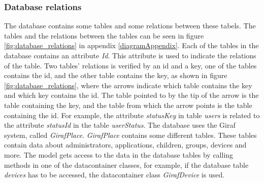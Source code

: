 \subsubsection{Database relations}
The database contains some tables and some relations between these tabels. The tables and the relations between the tables can be seen in figure \ref{fig:database_relations} in appendix \ref{diagramAppendix}.
Each of the tables in the database contains an attribute \textit{Id}. This attribute is used to indicate the relations of the table. Two tables' relations is verified by an id and a key, one of the tables contains the id, and the other table contains the key, as shown in figure \ref{fig:database_relations}, where the arrows indicate which table contains the key and which key contains the id. The table pointed to by the tip of the arrow is the table containing the key, and the table from which the arrow points is the table containing the id. 
For example, the attribute  \textit{statusKey} in table \textit{users} is related to the attribute \textit{statusId} in the table \textit{userStatus}.
The database uses the Giraf system, called \textit{GirafPlace}. \textit{GirafPlace} contains some different tables. These tables contain data about administrators, applications, children, groups, devices and more.
The model gets access to the data in the database tables by calling methods in one of the datacontainer classes, for example, if the database table \textit{devices} has to be accessed, the datacontainer class \textit{GirafDevice} is used. 
